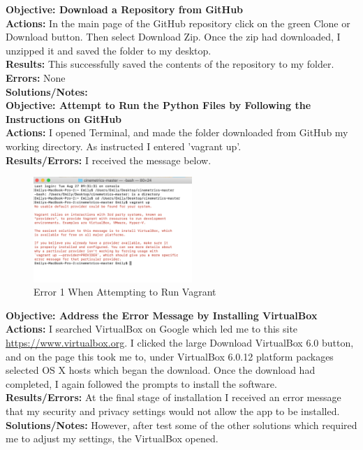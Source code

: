 \documentclass{article}
\begin{document}
\textbf{Objective: Download a Repository from GitHub}\\
\textbf{Actions:} In the main page of the GitHub repository click on the green Clone or Download button. Then select Download Zip. Once the zip had downloaded, I unzipped it and saved the folder to my desktop.\\
\textbf{Results:} This successfully saved the contents of the repository to my folder.\\
\textbf{Errors:} None\\
\textbf{Solutions/Notes:}\\

\textbf{Objective: Attempt to Run the Python Files by Following the Instructions on GitHub}\\
\textbf{Actions:} I opened Terminal, and made the folder downloaded from GitHub my working directory. As instructed I entered 'vagrant up'.\\
\textbf{Results/Errors:} I received the message below.
\begin{figure}[htp]
    \centering
    \includegraphics[width=6cm]{Vagrant_Image_1.png}
    \caption{Error 1 When Attempting to Run Vagrant}
\end{figure}

\textbf{Objective: Address the Error Message by Installing VirtualBox}\\
\textbf{Actions:} I searched VirtualBox on Google which led me to this site \url{https://www.virtualbox.org}. I clicked the large Download VirtualBox 6.0 button, and on the page this took me to, under VirtualBox 6.0.12 platform packages selected OS X hosts which began the download. Once the download had completed, I again followed the prompts to install the software.\\
\textbf{Results/Errors:} At the final stage of installation I received an error message that my security and privacy settings would not allow the app to be installed. \\
\textbf{Solutions/Notes:} However, after test some of the other solutions which required me to adjust my settings, the VirtualBox opened.\\
\end{document}
